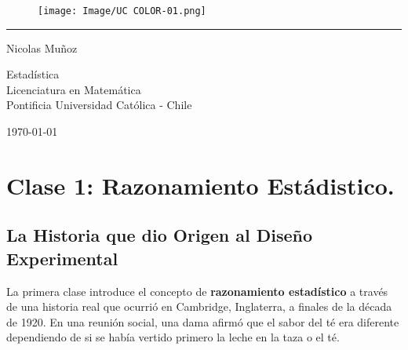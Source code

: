 \documentclass[11pt]{article}
\def\reportTile{Apuntes}			%
\def\subject{Estadística}			%
\def\writter{Nicolas Muñoz}		%
\def\course{Licenciatura en Matemática}
\def\university{Pontificia Universidad Católica - Chile}
\def\course{Licenciatura en Matemática}
\def\university{Pontificia Universidad Católica - Chile}
\theoremstyle{definition} %
\begin{document}
\begin{titlepage}

	\def\logoSize{0.2}
	\begin{figure}
  \hfill
  \texttt{[image: Image/UC COLOR-01.png]}
	\end{figure}

	\vspace*{1.75cm}

	\begin{spacing}{2}
	\centering{
	\Huge{
		\textbf{\reportTile}
	}
	}
	\end{spacing}
	
	\hrule
	
	\vfill
	\begin{flushright}
	\LARGE{\writter}

	\vspace{2cm}
	
	\Large
	\subject\\
	\course\\
	\university
	
	\vspace{1cm}
	
	\today
	\end{flushright}
	
\end{titlepage}
	

\tableofcontents
\cleardoublepage


\section{Clase 1: Razonamiento Estádistico.}

\subsection{La Historia que dio Origen al Diseño Experimental}

La primera clase introduce el concepto de \textbf{razonamiento estadístico} a través de una historia real que ocurrió en Cambridge, Inglaterra, a finales de la década de 1920. En una reunión social, una dama afirmó que el sabor del té era diferente dependiendo de si se había vertido primero la leche en la taza o el té.
\end{document}
